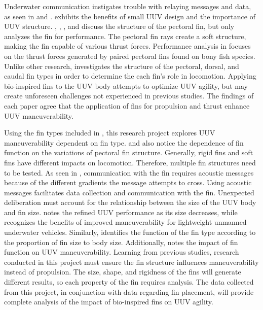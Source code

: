\documentclass{IEEEtran}
\begin{document}
Underwater communication instigates trouble with relaying messages and data, as seen in \cite{hiller2012expanding} and \cite{xu2007initial}.  \cite{hiller2012expanding} exhibits the benefits of small UUV design and the importance of UUV structure.  \cite{geder2013maneuvering}, \cite{tangorra2006biorobotic}, \cite{westneat2004structure}, and \cite{lauder2004morphology} discuss the structure of the pectoral fin, but only \cite{westneat2004structure} analyzes the fin for performance.  The pectoral fin rays create a soft structure, making the fin capable of various thrust forces.  Performance analysis in \cite{westneat2004structure} focuses on the thrust forces generated by paired pectoral fins found on bony fish species.  Unlike other research, \cite{lauder2004morphology} investigates the structure of the pectoral, dorsal, and caudal fin types in order to determine the each fin’s role in locomotion.  Applying bio-inspired fins to the UUV body attempts to optimize UUV agility, but may create unforeseen challenges not experienced in previous studies.  The findings of each paper agree that the application of fins for propulsion and thrust enhance UUV maneuverability.  

Using the fin types included in \cite{lauder2004morphology}, this research project explores UUV maneuverability dependent on fin type.  \cite{westneat2004structure} and \cite{lauder2004morphology} also notice the dependence of fin function on the variations of pectoral fin structure.  Generally, rigid fins and soft fins have different impacts on locomotion.  Therefore, multiple fin structures need to be tested.  As seen in \cite{xu2007initial}, communication with the fin requires acoustic messages because of the different gradients the message attempts to cross.  Using acoustic messages facilitates data collection and communication with the fin.  Unexpected deliberation must account for the relationship between the size of the UUV body and fin size.  \cite{hiller2012expanding} notes the refined UUV performance as its size decreases, while \cite{xu2007initial} recognizes the benefits of improved maneuverability for lightweight unmanned underwater vehicles.  Similarly, \cite{lauder2004morphology} identifies the function of the fin type according to the proportion of fin size to body size.  Additionally, \cite{lauder2004morphology} notes the impact of fin function on UUV maneuverability.  Learning from previous studies, research conducted in this project must ensure the fin structure influences maneuverability instead of propulsion.  The size, shape, and rigidness of the fins will generate different results, so each property of the fin requires analysis.  The data collected from this project, in conjunction with data regarding fin placement, will provide complete analysis of the impact of bio-inspired fins on UUV agility.     
\end{document}
